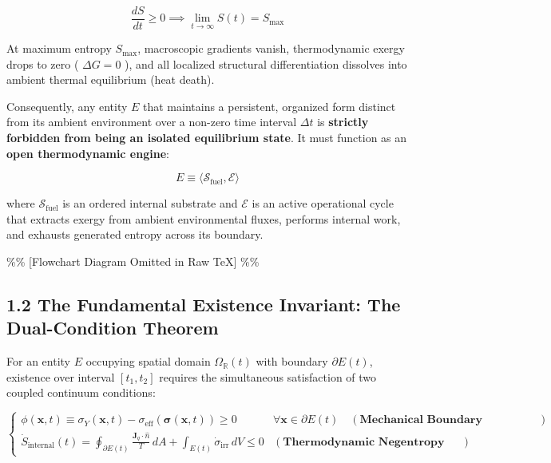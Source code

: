 \documentclass[11pt,a4paper]{article}
\theoremstyle{definition}
\theoremstyle{remark}
\begin{document}
\begin{equation}
\frac{dS}{dt} \ge 0 \implies \lim_{t \to \infty} S(t) = S_{\text{max}}
\end{equation}


At maximum entropy $S_{\text{max}}$, macroscopic gradients vanish, thermodynamic exergy drops to zero ( $\Delta G = 0$ ), and all localized structural differentiation dissolves into ambient thermal equilibrium (heat death).

Consequently, any entity $E$ that maintains a persistent, organized form distinct from its ambient environment over a non-zero time interval $\Delta t$ is \textbf{strictly forbidden from being an isolated equilibrium state}. It must function as an \textbf{open thermodynamic engine}:


\begin{equation}
\boxed{E \equiv \langle \mathcal{S}_{\text{fuel}}, \mathcal{E} \rangle}
\end{equation}


where $\mathcal{S}_{\text{fuel}}$ is an ordered internal substrate and $\mathcal{E}$ is an active operational cycle that extracts exergy from ambient environmental fluxes, performs internal work, and exhausts generated entropy across its boundary.

\%\% [Flowchart Diagram Omitted in Raw TeX] \%\%

\subsection{1.2 The Fundamental Existence Invariant: The Dual-Condition Theorem}
For an entity $E$ occupying spatial domain $\Omega_{\mathbb{R}}(t)$ with boundary $\partial E(t)$, existence over interval $[t_1, t_2]$ requires the simultaneous satisfaction of two coupled continuum conditions:


\begin{equation}
\boxed{\begin{cases}
\phi(\mathbf{x}, t) \equiv \sigma_Y(\mathbf{x}, t) - \sigma_{\text{eff}}(\boldsymbol{\sigma}(\mathbf{x}, t)) \ge 0 & \forall \mathbf{x} \in \partial E(t) \quad (\textbf{Mechanical Boundary Confinement}) \\[8pt]
\dot{S}_{\text{internal}}(t) = \oint_{\partial E(t)} \frac{\mathbf{J}_q \cdot \hat{n}}{T} \, dA + \int_{E(t)} \dot{\sigma}_{\text{irr}} \, dV \le 0 & (\textbf{Thermodynamic Negentropy Harvesting})
\end{cases}}
\end{equation}
\end{document}
